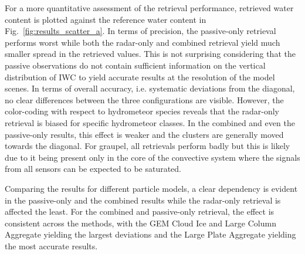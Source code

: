 \documentclass[journal abbreviation, manuscript]{copernicus}
\begin{document}
For a more quantitative assessment of the retrieval performance, retrieved water
content is plotted against the reference water content in
Fig.~\ref{fig:results_scatter_a}. In terms of precision, the passive-only
retrieval performs worst while both the radar-only and combined retrieval yield
much smaller spread in the retrieved values. This is not surprising considering
that the passive observations do not contain sufficient information on the
vertical distribution of IWC to yield accurate results at the resolution of the
model scenes. In terms of overall accuracy, i.e. systematic deviations from the
diagonal, no clear differences between the three configurations are visible.
However, the color-coding with respect to hydrometeor species reveals that the
radar-only retrieval is biased for specific hydrometeor classes. In the combined
and even the passive-only results, this effect is weaker and the clusters are
generally moved towards the diagonal. For graupel, all retrievals perform badly
but this is likely due to it being present only in the core of the convective
system where the signals from all sensors can be expected to be saturated.

Comparing the results for different particle models, a clear dependency is
evident in the passive-only and the combined results while the radar-only
retrieval is affected the least. For the combined and passive-only
retrieval, the effect is consistent across the methods, with the GEM Cloud Ice
and Large Column Aggregate yielding the largest deviations and the Large Plate
Aggregate yielding the most accurate results.
\end{document}
